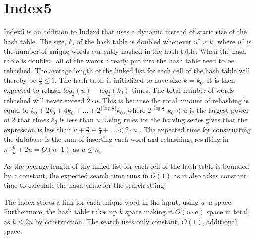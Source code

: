 \section{Index5}
\label{section:Index5}

Index5 is an addition to Index4 that uses a dynamic instead of static size of the hash table. The size, $k$, of the hash table is doubled whenever $u^*\geq k$, where $u^*$ is the number of unique words currently hashed in the hash table. When the hash table is doubled, all of the words already put into the hash table need to be rehashed. The average length of the linked list for each cell of the hash table will thereby be $\frac{u}{k} \leq 1$. The hash table is initialized to have size $k=k_0$. It is then expected to rehash $log_2(u)-log_2(k_0)$ times. The total number of words rehashed will never exceed $2\cdot u$. This is because the total amount of rehashing is equal to $k_0 + 2k_0 + 4k_0 + \dots + 2^{\lfloor\log\frac{u}{k}\rfloor}k_0$, where $2^{\lfloor\log\frac{u}{k}\rfloor}k_0 < u$ is the largest power of 2 that times $k_0$ is less than $u$. Using rules for the halving series gives that the expression is less than $u + \frac{u}{2} + \frac{u}{4} + ... < 2\cdot u$ . The expected time for constructing the database is the sum of inserting each word and rehashing, resulting in $n\cdot \frac{u}{k} + 2u = O(n\cdot 1)$ as $u\leq n$.

As the average length of the linked list for each cell of the hash table is bounded by a constant, the expected search time runs in $O(1)$ as it also takes constant time to calculate the hash value for the search string.

The index stores a link for each unique word in the input, using $u\cdot a$ space. Furthermore, the hash table takes up $k$ space making it $O(u\cdot a)$ space in total, as $k\leq 2u$ by construction. The search uses only constant, $O(1)$, additional space. 
